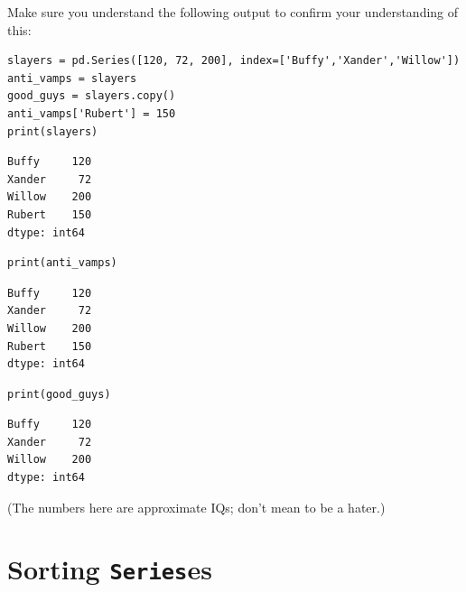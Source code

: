 Make sure you understand the following output to confirm your understanding of
this:


\begin{Verbatim}[fontsize=\scriptsize,samepage=true,frame=single,framesep=3mm]
slayers = pd.Series([120, 72, 200], index=['Buffy','Xander','Willow'])
anti_vamps = slayers
good_guys = slayers.copy()
anti_vamps['Rubert'] = 150
print(slayers)
\end{Verbatim}
\vspace{-.3in}

\begin{Verbatim}[fontsize=\scriptsize,samepage=true,frame=leftline,framesep=5mm,framerule=1mm]
Buffy     120
Xander     72
Willow    200
Rubert    150
dtype: int64
\end{Verbatim}

\begin{Verbatim}[fontsize=\scriptsize,samepage=true,frame=single,framesep=3mm]
print(anti_vamps)
\end{Verbatim}
\vspace{-.3in}

\begin{Verbatim}[fontsize=\scriptsize,samepage=true,frame=leftline,framesep=5mm,framerule=1mm]
Buffy     120
Xander     72
Willow    200
Rubert    150
dtype: int64
\end{Verbatim}

\begin{Verbatim}[fontsize=\scriptsize,samepage=true,frame=single,framesep=3mm]
print(good_guys)
\end{Verbatim}
\vspace{-.3in}

\begin{Verbatim}[fontsize=\scriptsize,samepage=true,frame=leftline,framesep=5mm,framerule=1mm]
Buffy     120
Xander     72
Willow    200
dtype: int64
\end{Verbatim}

(The numbers here are approximate IQs; don't mean to be a hater.)


\section{Sorting \texttt{Series}es}


